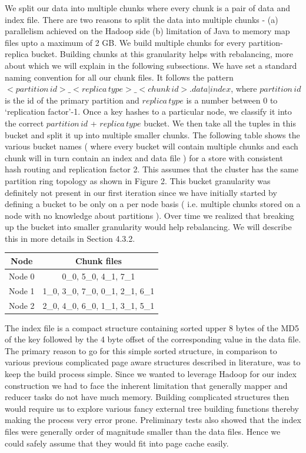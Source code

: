 \documentclass[10pt,twocolumn,preprint,natbib,authoryear]{sigplanconf}
\begin{document}
We split our data into multiple chunks where every chunk is a pair of data and index file. There are two reasons to split the data into multiple chunks - (a) parallelism achieved on the Hadoop side (b) limitation of Java to memory map files upto a maximum of 2 GB. We build multiple chunks for every partition-replica bucket. Building chunks at this granularity helps with rebalancing, more about which we will explain in the following subsections. We have set a standard naming convention for all our chunk files. It follows the pattern $<partition\,id>\_<replica\,type>\_<chunk\,id>.data|index$, where $partition\,id$ is the id of the primary partition and $replica\,type$ is a number between 0 to `replication factor'-1. Once a key hashes to a particular node, we classify it into the correct $partition\,id$ + $replica\,type$ bucket. We then take all the tuples in this bucket and split it up into multiple smaller chunks. The following table shows the various bucket names ( where every bucket will contain multiple chunks and each chunk will in turn contain an index and data file ) for a store with consistent hash routing and replication factor 2. This assumes that the cluster has the same partition ring topology as shown in Figure 2. This bucket granularity was definitely not present in our first iteration since we have initially started by defining a bucket to be only on a per node basis ( i.e. multiple chunks stored on a node with no knowledge about partitions ). Over time we realized that breaking up the bucket into smaller granularity would help rebalancing. We will describe this in more details in Section 4.3.2. 

\begin{center}
    \begin{tabular}{ | c | c | }
    \hline
    Node & Chunk files \\ \hline
   Node 0 &  0\_0, 5\_0, 4\_1, 7\_1 \\
   Node 1 &   1\_0, 3\_0, 7\_0, 0\_1, 2\_1, 6\_1 \\
   Node 2 &    2\_0, 4\_0, 6\_0, 1\_1, 3\_1, 5\_1  \\
\hline
    \end{tabular}
\end{center}


The index file is a compact structure containing sorted upper 8 bytes of the MD5 of the key followed by the 4 byte offset of the corresponding value in the data file. The primary reason to go for this simple sorted structure, in comparison to various previous complicated page aware structures described in literature, was to keep the build process simple. Since we wanted to leverage Hadoop for our index construction we had to face the inherent limitation that generally mapper and reducer tasks do not have much memory. Building complicated structures then would require us to explore various fancy external tree building functions thereby making the process very error prone. Preliminary tests also showed that the index files were generally order of magnitude smaller than the data files. Hence we could safely assume that they would fit into page cache easily. 
\end{document}
